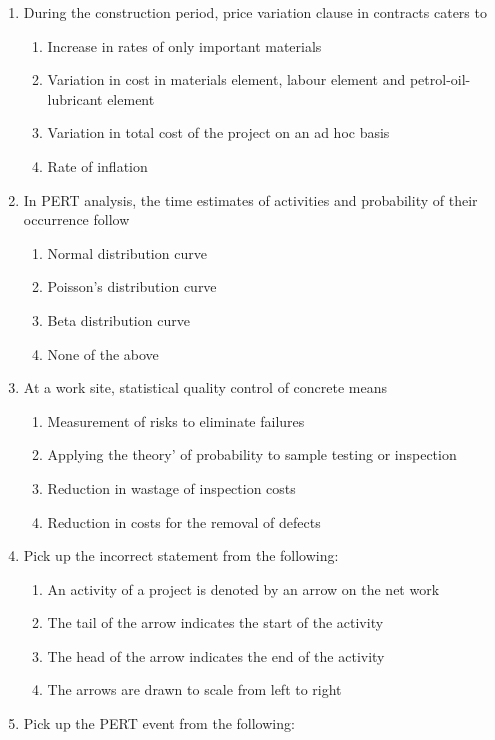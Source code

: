 \documentclass[11pt,a4paper]{article}
\begin{document}
\begin{enumerate}
\item{During the construction period, price variation clause in contracts caters to}
\begin{enumerate}[label=\Alph*.]
\item{Increase in rates of only important materials}
\item{Variation in cost in materials element, labour element and petrol-oil-lubricant element}
\item{Variation in total cost of the project on an ad hoc basis}
\item{Rate of inflation}
\end{enumerate}
\item{In PERT analysis, the time estimates of activities and probability of their occurrence follow}
\begin{enumerate}[label=\Alph*.]
\item{Normal distribution curve}
\item{Poisson's distribution curve}
\item{Beta distribution curve}
\item{None of the above}
\end{enumerate}
\item{At a work site, statistical quality control of concrete means}
\begin{enumerate}[label=\Alph*.]
\item{Measurement of risks to eliminate failures}
\item{Applying the theory' of probability to sample testing or inspection}
\item{Reduction in wastage of inspection costs}
\item{Reduction in costs for the removal of defects}
\end{enumerate}
\item{Pick up the incorrect statement from the following:}
\begin{enumerate}[label=\Alph*.]
\item{An activity of a project is denoted by an arrow on the net work}
\item{The tail of the arrow indicates the start of the activity}
\item{The head of the arrow indicates the end of the activity}
\item{The arrows are drawn to scale from left to right}
\end{enumerate}
\item{Pick up the PERT event from the following:}
\begin{enumerate}[label=\Alph*.]

\end{enumerate}
\end{enumerate}
\end{document}
